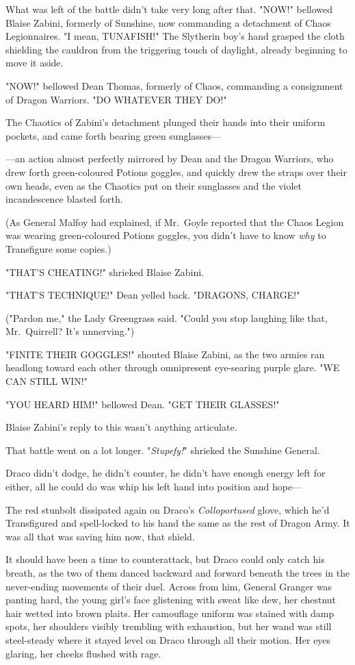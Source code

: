 What was left of the battle didn't take very long after that.
\later
"NOW!" bellowed Blaise Zabini, formerly of Sunshine, now commanding a
detachment of Chaos Legionnaires. "I mean, TUNAFISH!" The Slytherin boy's hand
grasped the cloth shielding the cauldron from the triggering touch of daylight,
already beginning to move it aside.

"NOW!" bellowed Dean Thomas, formerly of Chaos, commanding a consignment of
Dragon Warriors. "DO WHATEVER THEY DO!"

The Chaotics of Zabini's detachment plunged their hands into their uniform
pockets, and came forth bearing green sunglasses---

---an action almost perfectly mirrored by Dean and the Dragon Warriors, who
drew forth green-coloured Potions goggles, and quickly drew the straps over
their own heads, even as the Chaotics put on their sunglasses and the violet
incandescence blasted forth.

(As General Malfoy had explained, if Mr.~Goyle reported that the Chaos Legion
was wearing green-coloured Potions goggles, you didn't have to know \emph{why}
to Transfigure some copies.)

"THAT'S CHEATING!" shrieked Blaise Zabini.

"THAT'S TECHNIQUE!" Dean yelled back. "DRAGONS, CHARGE!"

("Pardon me," the Lady Greengrass said. "Could you stop laughing like that,
Mr.~Quirrell? It's unnerving.")

"FINITE THEIR GOGGLES!" shouted Blaise Zabini, as the two armies ran headlong
toward each other through omnipresent eye-searing purple glare. "WE CAN STILL
WIN!"

"YOU HEARD HIM!" bellowed Dean. "GET THEIR GLASSES!"

Blaise Zabini's reply to this wasn't anything articulate.

That battle went on a lot longer.
\later
"\emph{Stupefy!}" shrieked the Sunshine General.

Draco didn't dodge, he didn't counter, he didn't have enough energy left for
either, all he could do was whip his left hand into position and hope---

The red stunbolt dissipated again on Draco's \emph{Colloportused} glove, which
he'd Transfigured and spell-locked to his hand the same as the rest of Dragon
Army. It was all that was saving him now, that shield.

It should have been a time to counterattack, but Draco could only catch his
breath, as the two of them danced backward and forward beneath the trees in the
never-ending movements of their duel. Across from him, General Granger was
panting hard, the young girl's face glistening with sweat like dew, her
chestnut hair wetted into brown plaits. Her camouflage uniform was stained with
damp spots, her shoulders visibly trembling with exhaustion, but her wand was
still steel-steady where it stayed level on Draco through all their motion. Her
eyes glaring, her cheeks flushed with rage.

